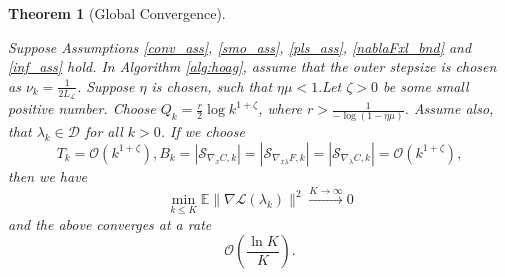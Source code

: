 \documentclass[11pt, twoside]{report}
\newtheorem{theorem}{Theorem}[section]
\begin{document}
\begin{theorem}[Global Convergence] \label{hoag_thm_glcv}

Suppose Assumptions \ref{conv_ass}, \ref{smo_ass}, \ref{pls_ass}, \ref{nablaFxl_bnd} and \ref{inf_ass} hold.
In Algorithm \ref{alg:hoag}, assume that the outer stepsize is chosen as $\nu_k = \frac{1}{2L_\mathcal{L}}$. Suppose $\eta$ is chosen, such that $\eta \mu <1.$Let $\zeta > 0 $ be some small positive number. Choose $Q_k = \frac{r}{2}\log{k^{1+\zeta}}$, where $r > \frac{1}{-\log(1-\eta\mu)}$. Assume also, that $\lambda_k \in \mathcal{D}$ for all $k>0$.
If we choose
\begin{equation}\label{params_conv}
    T_k = \mathcal{O}(k^{1+\zeta}), B_k = |\mathcal{S}_{\nabla_x C,k}| = |\mathcal{S}_{\nabla_{x\lambda} F,k}| = |\mathcal{S}_{\nabla_\lambda C,k}| =\mathcal{O}(k^{1 +\zeta}),
\end{equation}
then we have
\[\min_{k \leq K} \mathbb{E}\|\nabla \mathcal{L}(\lambda_k)\|^2 \xrightarrow[]{K \to \infty} 0\]
 and the above converges at a rate
\[\mathcal{O} \left(\frac{\ln{K}}{K} \right).\]
\end{theorem}
\end{document}
